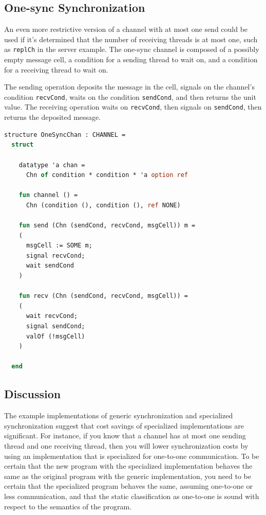 \documentclass[letterpaper, 11pt]{extarticle}
\begin{document}
\subsection{One-sync Synchronization}

An even more restrictive version of a channel with at most one send could be used if it's
determined that the number of receiving threads is at most one,
such as \lstinline{replCh} in the server example.
The one-sync channel is
composed of a possibly empty message cell, a condition for a sending thread to wait on,
and a condition for a receiving thread to wait on.

The sending operation deposits the message in the cell, signals on the channel's condition \lstinline{recvCond},
waits on the condition \lstinline{sendCond}, and then returns the unit value.
The receiving operation waits on \lstinline{recvCond},
then signals on \lstinline{sendCond}, then returns the deposited message.

\begin{lstlisting}[language=ML, mathescape]
  structure OneSyncChan : CHANNEL =
  struct

    datatype 'a chan =
      Chn of condition * condition * 'a option ref

    fun channel () =
      Chn (condition (), condition (), ref NONE)

    fun send (Chn (sendCond, recvCond, msgCell)) m =
    (
      msgCell := SOME m;
      signal recvCond;  
      wait sendCond
    )

    fun recv (Chn (sendCond, recvCond, msgCell)) =
    (
      wait recvCond;
      signal sendCond;
      valOf (!msgCell)
    )

  end
\end{lstlisting}

\subsection{Discussion}
The example implementations of generic synchronization and specialized synchronization suggest
that cost savings of specialized implementations are significant. For instance, if you know that
a channel has at most one sending thread and one receiving thread, then you will
lower synchronization costs by
using an implementation that is specialized for one-to-one communication. To be certain that
the new program with the specialized implementation behaves the same as the original program
with the generic implementation, you need to be certain that the
specialized program behaves the same, assuming one-to-one or less communication, and that
the static classification as one-to-one is sound with respect to the semantics of the program. 
\end{document}
